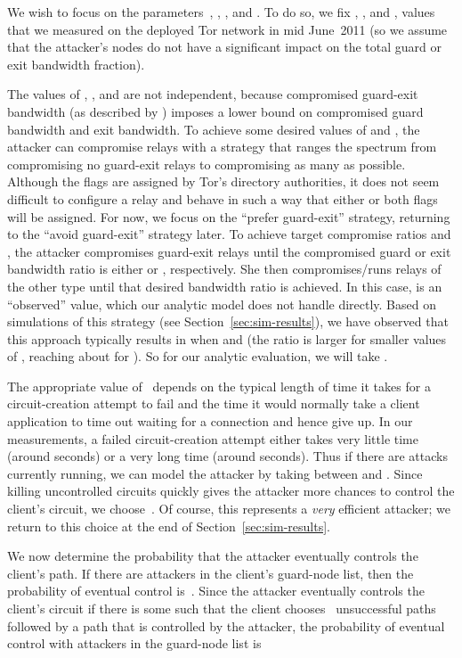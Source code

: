 \documentclass[]{lmcs}
\begin{document}
We wish to focus on the parameters~, , , and
.  To do so,
we fix , , and ,
values that we measured on the deployed Tor network in mid June~2011
(so we assume that the attacker's nodes do not have a significant
impact on the total guard or exit bandwidth fraction).

The values of , , and  are not independent, because
compromised guard-exit bandwidth (as described by ) imposes a
lower bound on compromised guard bandwidth and exit bandwidth.
To achieve some desired values of  and , the attacker can
compromise relays with a strategy that ranges the spectrum from
compromising no guard-exit relays to compromising as many as possible.
Although the flags are assigned by Tor's directory authorities, it does
not seem difficult to configure a relay and behave in such a way that
either or both flags will be assigned.  For now, we focus on the
``prefer guard-exit'' strategy, returning to the ``avoid guard-exit''
strategy later.  To achieve
target compromise ratios  and , the attacker compromises
guard-exit relays until the compromised guard or exit bandwidth ratio
is either  or , respectively.  She then compromises/runs relays
of the other type until that desired bandwidth ratio is achieved.
In this case,  is an ``observed'' value, which our analytic model
does not handle directly.  Based on simulations of this
strategy (see Section~\ref{sec:sim-results}), we have observed that this
approach typically results in  
when  and  (the ratio is larger for smaller values
of , reaching about  for ).  So for our analytic evaluation, 
we will take .

The appropriate value of~ depends on the typical length
of time it takes for a circuit-creation attempt to fail and the time
it would normally take a client application to time out waiting for
a connection and hence give up.  
In our measurements, a failed circuit-creation attempt
either takes very little time (around  seconds) or a very long time
(around  seconds).  Thus if there are attacks currently running,
we can model the attacker by taking  between  and .
Since killing uncontrolled circuits quickly gives the attacker more
chances to control the client's circuit,
we choose~.  Of course, this represents a \emph{very} efficient
attacker; we return to this choice at the end of
Section~\ref{sec:sim-results}.


We now determine the probability that the attacker eventually
controls the client's path.
If there are  attackers in the client's guard-node list, then
the probability of eventual control is~.
Since the attacker eventually controls the client's circuit if there
is some  such that the
client chooses~ unsuccessful paths followed by a path that is
controlled by the attacker,
the probability of
eventual control with  attackers in the guard-node list is
\end{document}

